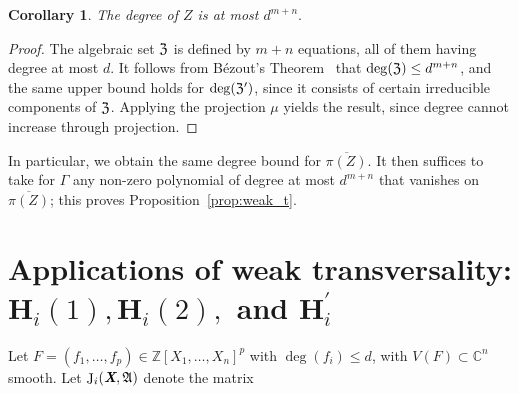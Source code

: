 \documentclass[a4paper]{article}
\def\A{\mathfrak{A}}
\def\Xb{\textit{\textbf{X}}}
\DeclareMathOperator{\J}{J}
\newcommand{\ZZ}{{\mathbb{Z}}}
\def\C{\mathbb{C}}
\newtheorem{corollary}[theorem]{Corollary}
\begin{document}
    
    \begin{corollary} 
      The degree of $Z$ is at most $d^{m+n}.$
    \end{corollary}
    \begin{proof}
      The algebraic set $\frak Z$ is defined by $m+n$ equations, all of
      them having degree at most $d$. It follows from B\'ezout's
      Theorem~\cite{H} that $\deg(\frak{Z}) \leq d^{m+n}$, and the same
      upper bound holds for $\deg(\frak{Z}')$, since it consists of
      certain irreducible components of $\frak Z$. Applying the projection
      $\mu$ yields the result, since degree cannot increase through
      projection.
    \end{proof}

    In particular, we obtain the same degree bound for
    $\overline{\pi(Z)}$.  It then suffices to take for $\Gamma$ any
    non-zero polynomial of degree at most $d^{m+n}$ that vanishes on
    $\overline{\pi(Z)}$; this proves Proposition~\ref{prop:weak_t}.


\section{Applications of weak transversality: $\textbf{H}_i(1), \textbf{H}_i(2),$ and $\textbf{H}_i^{'}$}\label{sec:5}

Let $F=(f_1,\hdots,f_p) \in \ZZ[X_1,\hdots,X_n]^p$ with $\deg(f_i)\leq d$, with $V(F)
\subset \C^n$ smooth. Let $\J_i(\Xb,\A)$ denote the matrix
    
\end{document}
